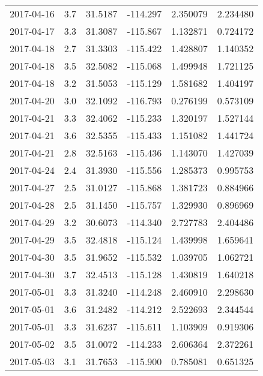 \begin{tabular}{lrrrrr}
2017-04-16 &       3.7 &  31.5187 &  -114.297 &         2.350079 &         2.234480 \\
2017-04-17 &       3.3 &  31.3087 &  -115.867 &         1.132871 &         0.724172 \\
2017-04-18 &       2.7 &  31.3303 &  -115.422 &         1.428807 &         1.140352 \\
2017-04-18 &       3.5 &  32.5082 &  -115.068 &         1.499948 &         1.721125 \\
2017-04-18 &       3.2 &  31.5053 &  -115.129 &         1.581682 &         1.404197 \\
2017-04-20 &       3.0 &  32.1092 &  -116.793 &         0.276199 &         0.573109 \\
2017-04-21 &       3.3 &  32.4062 &  -115.233 &         1.320197 &         1.527144 \\
2017-04-21 &       3.6 &  32.5355 &  -115.433 &         1.151082 &         1.441724 \\
2017-04-21 &       2.8 &  32.5163 &  -115.436 &         1.143070 &         1.427039 \\
2017-04-24 &       2.4 &  31.3930 &  -115.556 &         1.285373 &         0.995753 \\
2017-04-27 &       2.5 &  31.0127 &  -115.868 &         1.381723 &         0.884966 \\
2017-04-28 &       2.5 &  31.1450 &  -115.757 &         1.329930 &         0.896969 \\
2017-04-29 &       3.2 &  30.6073 &  -114.340 &         2.727783 &         2.404486 \\
2017-04-29 &       3.5 &  32.4818 &  -115.124 &         1.439998 &         1.659641 \\
2017-04-30 &       3.5 &  31.9652 &  -115.532 &         1.039705 &         1.062721 \\
2017-04-30 &       3.7 &  32.4513 &  -115.128 &         1.430819 &         1.640218 \\
2017-05-01 &       3.3 &  31.3240 &  -114.248 &         2.460910 &         2.298630 \\
2017-05-01 &       3.6 &  31.2482 &  -114.212 &         2.522693 &         2.344544 \\
2017-05-01 &       3.3 &  31.6237 &  -115.611 &         1.103909 &         0.919306 \\
2017-05-02 &       3.5 &  31.0072 &  -114.233 &         2.606364 &         2.372261 \\
2017-05-03 &       3.1 &  31.7653 &  -115.900 &         0.785081 &         0.651325 \\

\end{tabular}
